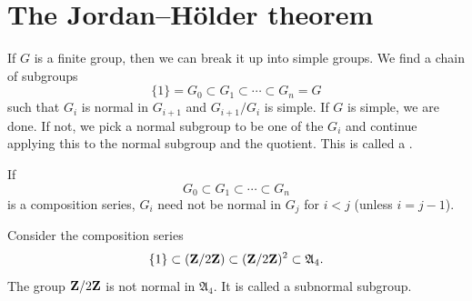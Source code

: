 \documentclass[11pt, twoside]{amsart}
\begin{document}
\section{The Jordan--Hölder theorem}
If $G$ is a finite group, then we can break it up into simple groups. We find a chain of subgroups
$$
\{1\} = G_0 \subset G_1 \subset \cdots\subset G_n = G
$$
such that $G_i$ is normal in $G_{i+1}$ and $G_{i+1}/G_i$ is simple. If $G$ is simple, we are done. If not, we pick a normal subgroup to be one of the $G_i$ and continue applying this to the normal subgroup and the quotient. This is called a . 

\begin{warning}
If
$$
G_0 \subset G_1 \subset \cdots\subset G_n 
$$
is a composition series, $G_i$ need not be normal in $G_j$ for $i<j$ (unless $i = j-1$).
\end{warning}
\begin{example}
Consider the composition series
$$
\{1\} \subset (\mathbf{Z}/2\mathbf{Z} ) \subset (\mathbf{Z}/2\mathbf{Z} )^2 \subset \mathfrak{A}_4.
$$
The group $\mathbf{Z}/2\mathbf{Z} $ is not normal in $\mathfrak{A}_4$. It is called a subnormal subgroup.
\end{example}
\end{document}
